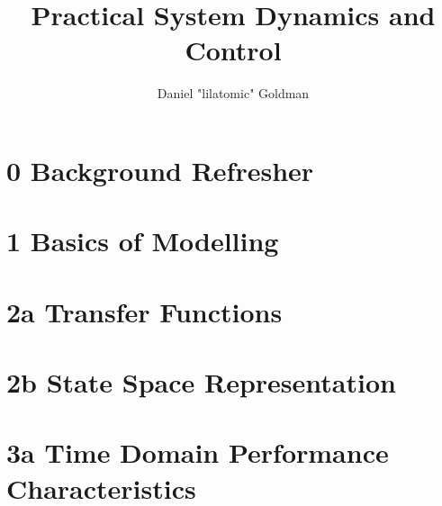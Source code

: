 \documentclass{templates/topic}
\title{Practical System Dynamics and Control}
\author{Daniel "lilatomic" Goldman}
\begin{document}
\maketitle

\part*{0 Background Refresher}



\part*{1 Basics of Modelling}





\part*{2a Transfer Functions}







\part*{2b State Space Representation}






\part*{3a Time Domain Performance Characteristics}



\end{document}
